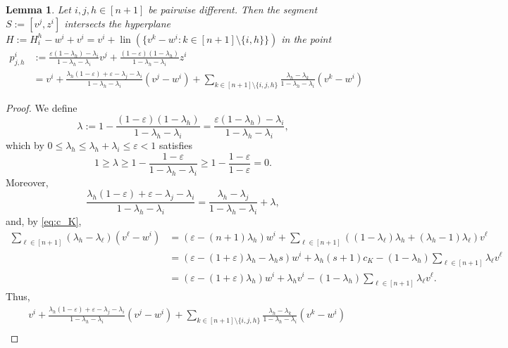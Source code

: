 \documentclass{amsart}
\newtheorem{lemma}[theorem]{Lemma}
\DeclareMathOperator{\lin}{lin}
\begin{document}
\begin{lemma}\label{lem:spikes_cutoff}
Let $i,j,h \in [n+1]$ be pairwise different.
Then the segment $S := [v^j, z^i]$ intersects the hyperplane
$H := H^h_i - w^i + v^i = v^i + \lin(\{ v^k - w^i : k \in [n+1] \setminus \{i,h\} \})$
in the point
\begin{align*}
	p^i_{j,h}
	& := \frac{\varepsilon (1 - \lambda_h) - \lambda_i}{1 - \lambda_h - \lambda_i} v^j + \frac{(1 - \varepsilon) (1 - \lambda_h)}{1 - \lambda_h - \lambda_i} z^i
    \\
	& = v^i + \frac{\lambda_h (1 - \varepsilon) + \varepsilon - \lambda_j - \lambda_i}{1 - \lambda_h - \lambda_i} (v^j - w^i) + \sum_{k \in [n+1] \setminus \{i,j,h\}} \frac{\lambda_h - \lambda_k}{1 - \lambda_h - \lambda_i} (v^k - w^i)
\end{align*}
\end{lemma} \begin{proof}
We define
\[
	\lambda
    := 1 - \frac{(1 - \varepsilon) (1 - \lambda_h)}{1 - \lambda_h - \lambda_i}
    = \frac{\varepsilon (1 - \lambda_h) - \lambda_i}{1 - \lambda_h - \lambda_i},
\]
which by $0 \leq \lambda_h \leq \lambda_h + \lambda_i \leq \varepsilon < 1$ satisfies
\[
	1
    \geq \lambda
    \geq 1 - \frac{1 - \varepsilon}{1 - \lambda_h - \lambda_i}
    \geq 1 - \frac{1 - \varepsilon}{1 - \varepsilon}
    = 0.
\]
Moreover,
\[
	\frac{\lambda_h (1 - \varepsilon) + \varepsilon - \lambda_j - \lambda_i}{1 - \lambda_h - \lambda_i}
    = \frac{\lambda_h - \lambda_j}{1 - \lambda_h - \lambda_i} + \lambda,
\]
and, by \eqref{eq:c_K},
\begin{align*}
	\sum_{\ell \in [n+1]} (\lambda_h - \lambda_\ell) (v^\ell - w^i)
    & = (\varepsilon - (n+1) \lambda_h) w^i + \sum_{\ell \in [n+1]} ((1 - \lambda_\ell) \lambda_h + (\lambda_h - 1) \lambda_\ell) v^\ell
    \\
	& = (\varepsilon - (1 + \varepsilon) \lambda_h - \lambda_h s) w^i + \lambda_h (s+1) c_K - (1 - \lambda_h) \sum_{\ell \in [n+1]} \lambda_\ell v^\ell
    \\
	& = (\varepsilon - (1 + \varepsilon) \lambda_h) w^i + \lambda_h v^i - (1 - \lambda_h) \sum_{\ell \in [n+1]} \lambda_\ell v^\ell.
\end{align*}
Thus,
\begin{align*}
	& v^i + \frac{\lambda_h (1 - \varepsilon) + \varepsilon - \lambda_j - \lambda_i}{1 - \lambda_h - \lambda_i} (v^j - w^i) + \sum_{k \in [n+1] \setminus \{i,j,h\}} \frac{\lambda_h - \lambda_k}{1 - \lambda_h - \lambda_i} (v^k - w^i)
    \\

\end{align*}
\end{proof}
\end{document}
